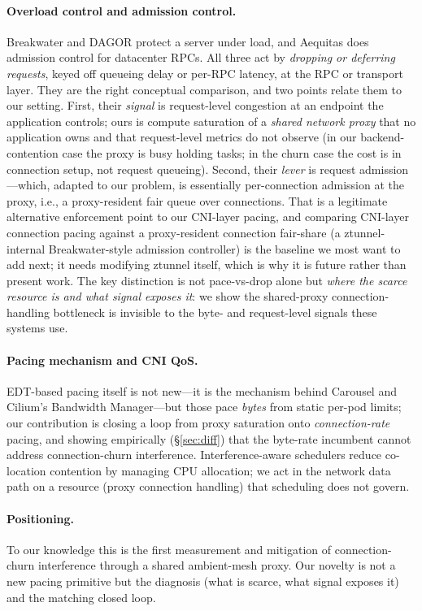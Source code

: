 \documentclass[10pt,twocolumn]{article}
\begin{document}
\paragraph{Overload control and admission control.} Breakwater and DAGOR protect a server
under load, and Aequitas does admission control for datacenter RPCs. All three act by
\emph{dropping or deferring requests}, keyed off queueing delay or per-RPC latency, at the
RPC or transport layer. They are the right conceptual comparison, and two points relate
them to our setting. First, their \emph{signal} is request-level congestion at an
endpoint the application controls; ours is compute saturation of a \emph{shared network
proxy} that no application owns and that request-level metrics do not observe (in our
backend-contention case the proxy is busy holding tasks; in the churn case the cost is in
connection setup, not request queueing). Second, their \emph{lever} is request
admission---which, adapted to our problem, is essentially per-connection admission at the
proxy, i.e., a proxy-resident fair queue over connections. That is a legitimate
alternative enforcement point to our CNI-layer pacing, and comparing CNI-layer connection
pacing against a proxy-resident connection fair-share (a ztunnel-internal Breakwater-style
admission controller) is the baseline we most want to add next; it needs modifying ztunnel
itself, which is why it is future rather than present work. The key distinction is not
pace-vs-drop alone but \emph{where the scarce resource is and what signal exposes it}:
we show the shared-proxy connection-handling bottleneck is invisible to the byte- and
request-level signals these systems use.

\paragraph{Pacing mechanism and CNI QoS.} EDT-based pacing itself is not new---it is the
mechanism behind Carousel and Cilium's Bandwidth Manager---but those pace \emph{bytes}
from static per-pod limits; our contribution is closing a loop from proxy saturation onto
\emph{connection-rate} pacing, and showing empirically (\S\ref{sec:diff}) that the
byte-rate incumbent cannot address connection-churn interference. Interference-aware
schedulers reduce co-location contention by managing CPU allocation; we act in the network
data path on a resource (proxy connection handling) that scheduling does not govern.

\paragraph{Positioning.} To our knowledge this is the first measurement and mitigation of
connection-churn interference through a shared ambient-mesh proxy. Our novelty is not a new
pacing primitive but the diagnosis (what is scarce, what signal exposes it) and the
matching closed loop.
\end{document}
